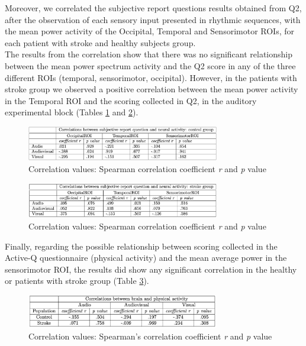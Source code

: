 Moreover, we correlated the subjective report questions results obtained from Q2, after the observation of each sensory input presented in rhythmic sequences, with the mean power activity of the Occipital, Temporal and Sensorimotor ROIs, for each patient with stroke and healthy subjects group.\\
The results from the correlation show that there was no significant relationship between the mean power spectrum activity and the Q2 score in any of the three different ROIs (temporal, sensorimotor, occipital). However, in the patients with stroke group we observed a positive correlation between the mean power activity in the Temporal ROI and the scoring collected in Q2, in the auditory experimental block (Tables \ref{fig: correlation values q2: control} and \ref{fig correlation values q2: stroke}).
\begin{figure}[H]
    \centering
    \includegraphics[width=0.75\textwidth]{scatter_plots/correlation_q2_control.png}
    \caption{Correlation values: Spearman correlation coefficient \textit{r} and \textit{p} value}
    \label{fig: correlation values q2: control} 
\end{figure}

\begin{figure}[H]
    \centering
    \includegraphics[width=0.75\textwidth]{scatter_plots/correlation_q2_stroke.png}
    \caption{Correlation values: Spearman correlation coefficient \textit{r} and \textit{p} value}
    \label{fig correlation values q2: stroke} 
\end{figure}

Finally, regarding the possible relationship between scoring collected in the Active-Q questionnaire (physical activity) and the mean average power in the sensorimotor ROI, the results did show any significant correlation in the healthy or patients with stroke group (Table \ref{fig: significance correlation activeq}). 
\begin{figure}[H]
    \centering
    \includegraphics[width=0.75\textwidth]{significance_tables/correlation_activeq_.png}
    \caption{Correlation values: Spearman's correlation coefficient \textit{r} and \textit{p} value}
    \label{fig: significance correlation activeq} 
\end{figure}

